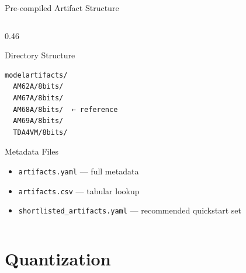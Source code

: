 \documentclass[aspectratio=169,12pt]{beamer}
\begin{document}
\begin{frame}{Pre-compiled Artifact Structure}
\begin{columns}[T]
\begin{column}{0.46\textwidth}
      \vspace{0.3cm}
      \begin{block}{Directory Structure}
        \begin{lstlisting}
modelartifacts/
  AM62A/8bits/
  AM67A/8bits/
  AM68A/8bits/  ← reference
  AM69A/8bits/
  TDA4VM/8bits/
        \end{lstlisting}
      \end{block}

      \vspace{0.2cm}
      \begin{exampleblock}{Metadata Files}
        \begin{itemize}\scriptsize
          \item \texttt{artifacts.yaml} — full metadata
          \item \texttt{artifacts.csv} — tabular lookup
          \item \texttt{shortlisted\_artifacts.yaml} — recommended quickstart set
        \end{itemize}
      \end{exampleblock}
    \end{column}
  \end{columns}
\end{frame}

\section{Quantization}
\end{document}

